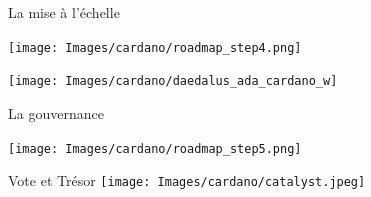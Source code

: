 \documentclass{beamer}
\begin{document}
\begin{frame}[label={sec:org78f4fe6}]{La mise à l'échelle}
  \begin{center}
    \texttt{[image: Images/cardano/roadmap\_step4.png]}
  \end{center}

  \centering
  \texttt{[image: Images/cardano/daedalus\_ada\_cardano\_w]}
\end{frame}

\begin{frame}[label={sec:orga2ff3d7}]{La gouvernance}
  \begin{center}
    \texttt{[image: Images/cardano/roadmap\_step5.png]}
  \end{center}

  \begin{block}{Vote et Trésor}
    \centering
    \texttt{[image: Images/cardano/catalyst.jpeg]}
  \end{block}
\end{frame}
\end{document}
